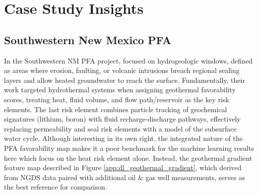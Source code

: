 \section{Case Study Insights}\label{ch5:case_insights}
\subsection{Southwestern New Mexico PFA}
In the Southwestern NM PFA project, \citet{bielicki_hydrogeolgic_2015} focused on hydrogeologic windows, defined as areas where erosion, faulting, or volcanic intrusions breach regional sealing layers and allow heated groundwater to reach the surface. Fundamentally, their work targeted hydrothermal systems when assigning geothermal favorability scores, treating heat, fluid volume, and flow path/reservoir as the key risk elements. The last risk element combines particle tracking of geochemical signatures (lithium, boron) with fluid recharge-discharge pathways, effectively replacing permeability and seal risk elements with a model of the subsurface water cycle. Although interesting in its own right, the integrated nature of the PFA favorability map makes it a poor benchmark for the machine learning results here which focus on the heat risk element alone. Instead, the geothermal gradient feature map described in Figure \ref{app:dl_geothermal_gradient}, which \citet{bielicki_hydrogeolgic_2015} derived from NGDS data paired with additional oil \& gas well measurements, serves as the best reference for comparison. 

